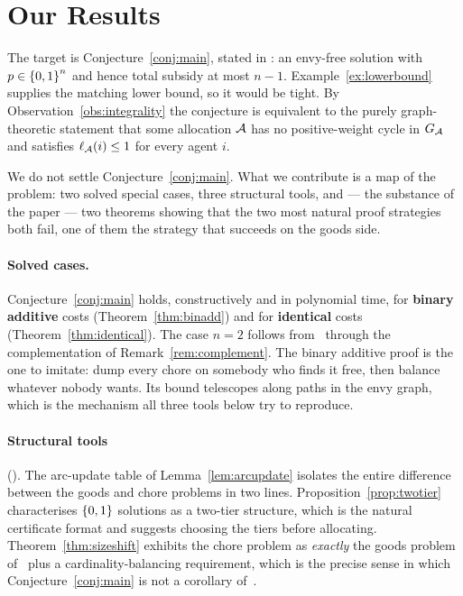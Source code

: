 \section{Our Results}
\label{sec:results}

The target is Conjecture~\ref{conj:main}, stated in : an
envy-free solution with $p \in \left\{0,1\right\}^n$ and hence total subsidy at
most $n-1$. Example~\ref{ex:lowerbound} supplies the matching lower bound, so it
would be tight. By Observation~\ref{obs:integrality} the conjecture is
equivalent to the purely graph-theoretic statement that some allocation $\mathcal{A}$
has no positive-weight cycle in $G_{\mathcal{A}}$ and satisfies
$\ell_{\mathcal{A}}(i) \le 1$ for every agent $i$.

We do not settle Conjecture~\ref{conj:main}. What we contribute is a map of the
problem: two solved special cases, three structural tools, and --- the substance
of the paper --- two theorems showing that the two most natural proof strategies
both fail, one of them the strategy that succeeds on the goods side.

\paragraph{Solved cases.}
Conjecture~\ref{conj:main} holds, constructively and in polynomial time, for
\textbf{binary additive} costs (Theorem~\ref{thm:binadd}) and for
\textbf{identical} costs (Theorem~\ref{thm:identical}). The case $n = 2$ follows
from~\cite{BKNS22} through the complementation of Remark~\ref{rem:complement}.
The binary additive proof is the one to imitate: dump every chore on somebody
who finds it free, then balance whatever nobody wants. Its bound telescopes
along paths in the envy graph, which is the mechanism all three tools below try
to reproduce.

\paragraph{Structural tools} ().
The arc-update table of Lemma~\ref{lem:arcupdate} isolates the entire difference
between the goods and chore problems in two lines. Proposition~\ref{prop:twotier}
characterises $\left\{0,1\right\}$ solutions as a two-tier structure, which is the natural
certificate format and suggests choosing the tiers before allocating.
Theorem~\ref{thm:sizeshift} exhibits the chore problem as \emph{exactly} the
goods problem of~\cite{BKNS22} plus a cardinality-balancing requirement, which
is the precise sense in which Conjecture~\ref{conj:main} is not a corollary
of~\cite{BKNS22}.

